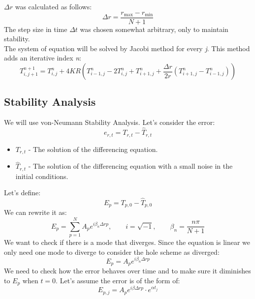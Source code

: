 \documentclass[11pt, a4paper]{article}
\begin{document}
\noindent $\Delta r$ was calculated as follows:
\begin{equation}
    \Delta r=\frac{r_\text{max}-r_\text{min}}{N+1}
\end{equation}
The step size in time $\Delta t$ was chosen somewhat arbitrary, only to maintain stability.\\

\noindent The system of equation will be solved by Jacobi method for every \emph{j}. This method adds an iterative index \emph{n}:
\begin{equation}
    \displaystyle T_{i,j+1}^{n+1}=T_{i,j}^n+4KR\left(T_{i-1,j}^n-2T_{i,j}^n+T_{i+1,j}^n+\frac{\Delta r}{2r}\left(T_{i+1,j}^n-T_{i-1,j}^n\right)\right)
\end{equation}

\subsection{Stability Analysis}
We will use  von-Neumann Stability Analysis. Let's consider the error:
\begin{equation}
    e_{r,t}=T_{r,t}-\hat{T}_{r,t}
\end{equation}
\begin{itemize}
    \item $T_{r,t}$ - The solution of the differencing equation.
    \item $\hat{T}_{r,t}$ - The solution of the differencing equation with a small noise in the initial conditions.
\end{itemize}
\noindent Let's define:
\begin{equation}
    E_p=T_{p,0}-\hat{T}_{p,0}
\end{equation}
We can rewrite it as:
\begin{equation}
    E_p=\sum_{p=1}^{N}A_pe^{i\beta_n\Delta rp},\qquad i=\sqrt{-1},\qquad\beta_n=\frac{n\pi}{N+1}
\end{equation}
We want to check if there is a mode that diverges. Since the equation is linear we only need one mode to diverge to consider the hole scheme as diverged:
\begin{equation}
    E_p=A_pe^{i\beta_n\Delta rp}
\end{equation}
We need to check how the error behaves over time and to make sure it diminishes to $E_p$ when $t=0$.
Let's assume the error is of the form of:
\begin{equation}
    E_{p,j}=A_pe^{i\beta\Delta rp}\cdot e^{\alpha t_j}
\end{equation}
\end{document}
